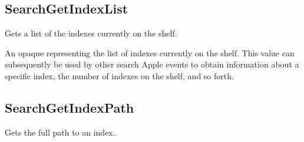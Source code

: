 \documentclass[letterpaper,12pt,english,openany,oneside]{sphinxmanual}
\begin{document}
\subsection{SearchGetIndexList}
\label{\detokenize{IAC_API_SearchIntro:searchgetindexlist}}
Gets a list of the indexes currently on the shelf.

\label{\detokenize{IAC_API_SearchIntro:apple-event-id-5}}

\begin{sphinxVerbatim}[commandchars=\\\{\}]
 
\end{sphinxVerbatim}


\begin{sphinxVerbatim}[commandchars=\\\{\}]
  
\end{sphinxVerbatim}

An opaque  representing the list of indexes currently on the shelf. This value can subsequently be used by other search Apple events to obtain information about a specific index, the number of indexes on the shelf, and so forth.


\subsection{SearchGetIndexPath}
\label{\detokenize{IAC_API_SearchIntro:searchgetindexpath}}
Gets the full path to an index.

\label{\detokenize{IAC_API_SearchIntro:apple-event-id-6}}

\begin{sphinxVerbatim}[commandchars=\\\{\}]
 
\end{sphinxVerbatim}
\label{\detokenize{IAC_API_SearchIntro:parameters-5}}
\end{document}
